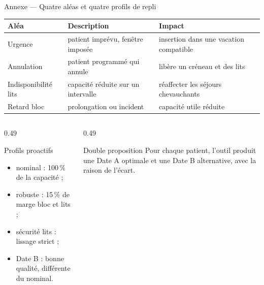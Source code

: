 \begin{frame}{Annexe --- Quatre aléas et quatre profils de repli}
  \scriptsize
  \renewcommand{\arraystretch}{1.08}
  \renewcommand{\arraystretch}{1.18}
  \begin{tabular}{@{}>{\raggedright\arraybackslash}p{2.6cm}>{\raggedright\arraybackslash}p{5.4cm}>{\raggedright\arraybackslash}p{4.6cm}@{}}
    \toprule
    \textbf{Aléa} & \textbf{Description} & \textbf{Impact} \\
    \midrule
    Urgence & patient imprévu, fenêtre imposée
      & insertion dans une vacation compatible \\
    Annulation & patient programmé qui annule
      & libère un créneau et des lits \\
    Indisponibilité lits & capacité réduite sur un intervalle
      & réaffecter les séjours chevauchants \\
    Retard bloc & prolongation ou incident
      & capacité utile réduite \\
    \bottomrule
  \end{tabular}

  \vspace{0.15cm}
  \begin{columns}[T,onlytextwidth]
    \begin{column}{0.49\textwidth}
      \begin{block}{Profils proactifs}
        \begin{itemize}
          \item nominal : 100\,\% de la capacité ;
          \item robuste : 15\,\% de marge bloc et lits ;
          \item sécurité lits : lissage strict ;
          \item Date B : bonne qualité, différente du nominal.
        \end{itemize}
      \end{block}
    \end{column}
    \begin{column}{0.49\textwidth}
      \begin{exampleblock}{Double proposition}
        \footnotesize Pour chaque patient, l'outil produit une Date A
        optimale et une Date B alternative, avec la raison de l'écart.
      \end{exampleblock}
    \end{column}
  \end{columns}
\end{frame}

